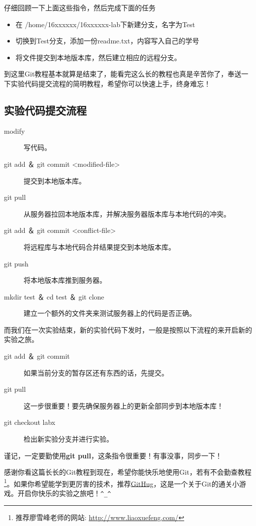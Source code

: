 \begin{exercise}
仔细回顾一下上面这些指令，然后完成下面的任务
  \begin{itemize}
    \item 在 /home/16xxxxxx/16xxxxxx-lab下新建分支，名字为Test
    \item 切换到Test分支，添加一份readme.txt，内容写入自己的学号
    \item 将文件提交到本地版本库，然后建立相应的远程分支。
  \end{itemize}
\end{exercise}

到这里Git教程基本就算是结束了，能看完这么长的教程也真是辛苦你了，奉送一下实验代码提交流程的简明教程，希望你可以快速上手，终身难忘！

\subsection{实验代码提交流程}

\begin{description}
\item[modify] 写代码。
\item[git add ＆ git commit <modified-file>] 提交到本地版本库。
\item[git pull] 从服务器拉回本地版本库，并解决服务器版本库与本地代码的冲突。
\item[git add ＆ git commit <conflict-file>] 将远程库与本地代码合并结果提交到本地版本库。
\item[git push] 将本地版本库推到服务器。
\item[mkdir test ＆ cd test ＆ git clone] 建立一个额外的文件夹来测试服务器上的代码是否正确。
\end{description}

而我们在一次实验结束，新的实验代码下发时，一般是按照以下流程的来开启新的实验之旅。

\begin{description}
\item[git add ＆ git commit] 如果当前分支的暂存区还有东西的话，先提交。
\item[git pull] 这一步很重要！要先确保服务器上的更新全部同步到本地版本库！
\item[git checkout labx] 检出新实验分支并进行实验。
\end{description}

谨记，一定要勤使用\textbf{git pull}，这条指令很重要！有事没事，同步一下！

感谢你看这篇长长的Git教程到现在，希望你能快乐地使用Git，若有不会勤查教程\footnote{推荐廖雪峰老师的网站:
\url{http://www.liaoxuefeng.com/}}。如果你希望能学到更厉害的技术，推荐\href{https://github.com/Gazler/githug}{GitHug}，这是一个关于Git的通关小游戏。开启你快乐的实验之旅吧！\verb|^_^|

